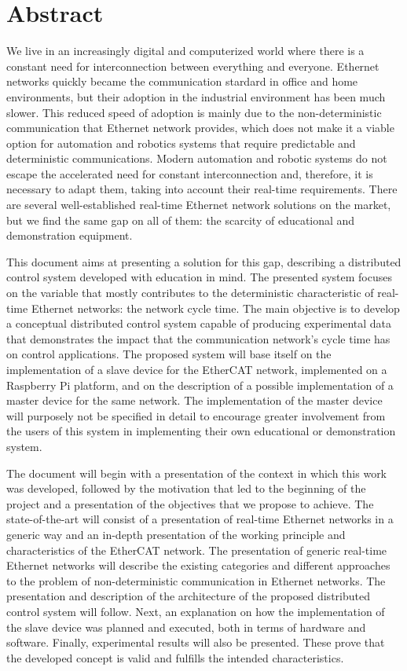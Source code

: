 \chapter*{Abstract}
We live in an increasingly digital and computerized world where there is a constant need for interconnection between everything and everyone.
Ethernet networks quickly became the communication stardard in office and home environments, but their adoption in the industrial environment has been much slower.
This reduced speed of adoption is mainly due to the non-deterministic communication that Ethernet network provides, which does not make it a viable option for automation and robotics systems that require predictable and deterministic communications.
Modern automation and robotic systems do not escape the accelerated need for constant interconnection and, therefore, it is necessary to adapt them, taking into account their real-time requirements.
There are several well-established real-time Ethernet network solutions on the market, but we find the same gap on all of them: the scarcity of educational and demonstration equipment.

This document aims at presenting a solution for this gap, describing a distributed control system developed with education in mind.
The presented system focuses on the variable that mostly contributes to the deterministic characteristic of real-time Ethernet networks: the network cycle time.
The main objective is to develop a conceptual distributed control system capable of producing experimental data that demonstrates the impact that the communication network's cycle time has on control applications.
The proposed system will base itself on the implementation of a slave device for the EtherCAT network, implemented on a Raspberry Pi platform, and on the description of a possible implementation of a master device for the same network.
The implementation of the master device will purposely not be specified in detail to encourage greater involvement from the users of this system in implementing their own educational or demonstration system.

The document will begin with a presentation of the context in which this work was developed, followed by the motivation that led to the beginning of the project and a presentation of the objectives that we propose to achieve.
The state-of-the-art will consist of a presentation of real-time Ethernet networks in a generic way and an in-depth presentation of the working principle and characteristics of the EtherCAT network.
The presentation of generic real-time Ethernet networks will describe the existing categories and different approaches to the problem of non-deterministic communication in Ethernet networks.
The presentation and description of the architecture of the proposed distributed control system will follow.
Next, an explanation on how the implementation of the slave device was planned and executed, both in terms of hardware and software.
Finally, experimental results will also be presented.
These prove that the developed concept is valid and fulfills the intended characteristics. 



